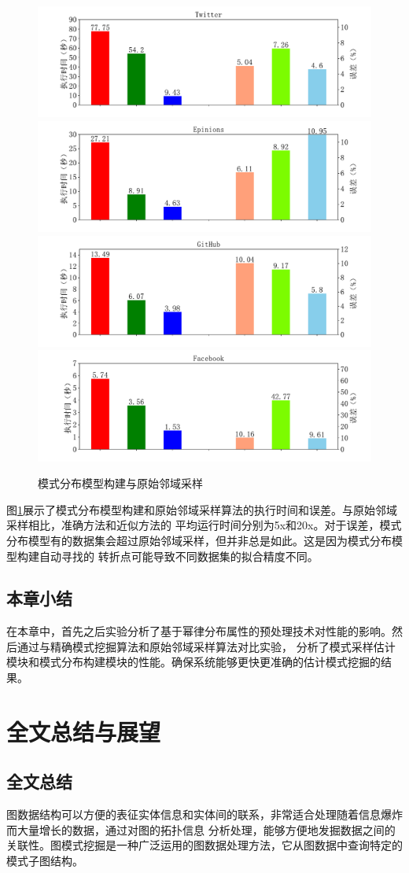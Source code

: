 \documentclass[master]{thesis-uestc}
\begin{document}
\begin{figure}
    \includegraphics[width=0.5\linewidth]{pic/fit-cmp-asap/Twitter.pdf}%
    \includegraphics[width=0.5\linewidth]{pic/fit-cmp-asap/Epinions.pdf}\\
    \includegraphics[width=0.5\linewidth]{pic/fit-cmp-asap/GitHub.pdf}%
    \includegraphics[width=0.5\linewidth]{pic/fit-cmp-asap/Facebook.pdf}
    \caption{模式分布模型构建与原始邻域采样}
    \label{fig:fit-cmp-asap}
\end{figure}

    图\ref{fig:fit-cmp-asap}展示了模式分布模型构建和原始邻域采样算法的执行时间和误差。与原始邻域采样相比，准确方法和近似方法的
平均运行时间分别为5x和20x。对于误差，模式分布模型有的数据集会超过原始邻域采样，但并非总是如此。这是因为模式分布模型构建自动寻找的
转折点可能导致不同数据集的拟合精度不同。

\section{本章小结}
    在本章中，首先之后实验分析了基于幂律分布属性的预处理技术对性能的影响。然后通过与精确模式挖掘算法和原始邻域采样算法对比实验，
分析了模式采样估计模块和模式分布构建模块的性能。确保系统能够更快更准确的估计模式挖掘的结果。

\chapter{全文总结与展望}


\section{全文总结}
    图数据结构可以方便的表征实体信息和实体间的联系，非常适合处理随着信息爆炸而大量增长的数据，通过对图的拓扑信息
分析处理，能够方便地发掘数据之间的关联性。图模式挖掘是一种广泛运用的图数据处理方法，它从图数据中查询特定的模式子图结构。
    
\end{document}
